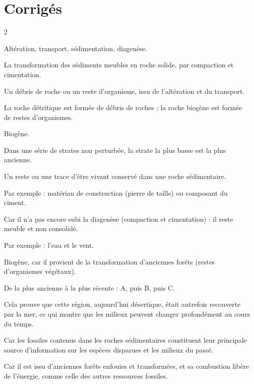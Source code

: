 \section{Corrigés}
\begin{multicols}{2}

Altération, transport, sédimentation, diagenèse.

La transformation des sédiments meubles en roche solide, par compaction et
cimentation.

Un débris de roche ou un reste d'organisme, issu de l'altération et du transport.

La roche détritique est formée de débris de roches ; la roche biogène est formée de
restes d'organismes.

Biogène.

Dans une série de strates non perturbée, la strate la plus basse est la plus
ancienne.

Un reste ou une trace d'être vivant conservé dans une roche sédimentaire.

Par exemple : matériau de construction (pierre de taille) ou composant du ciment.

Car il n'a pas encore subi la diagenèse (compaction et cimentation) : il reste meuble
et non consolidé.

Par exemple : l'eau et le vent.

Biogène, car il provient de la transformation d'anciennes forêts (restes
d'organismes végétaux).

De la plus ancienne à la plus récente : A, puis B, puis C.

Cela prouve que cette région, aujourd'hui désertique, était autrefois recouverte par
la mer, ce qui montre que les milieux peuvent changer profondément au cours du temps.

Car les fossiles contenus dans les roches sédimentaires constituent leur principale
source d'information sur les espèces disparues et les milieux du passé.

Car il est issu d'anciennes forêts enfouies et transformées, et sa combustion libère
de l'énergie, comme celle des autres ressources fossiles.


\end{multicols}
